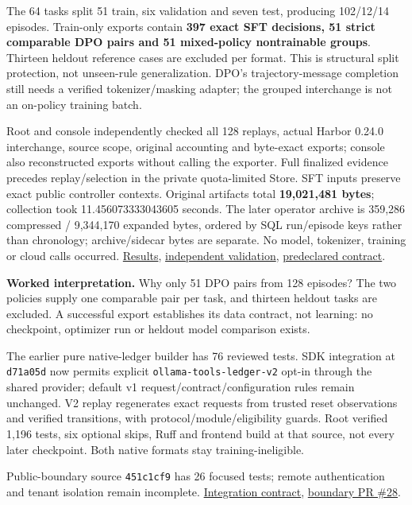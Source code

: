 \documentclass[
  11pt,
  letterpaper,
]{article}
\begin{document}
The 64 tasks split 51 train, six validation and seven test, producing
102/12/14 episodes. Train-only exports contain \textbf{397 exact SFT
decisions, 51 strict comparable DPO pairs and 51 mixed-policy
nontrainable groups}. Thirteen heldout reference cases are excluded per
format. This is structural split protection, not unseen-rule
generalization. DPO's trajectory-message completion still needs a
verified tokenizer/masking adapter; the grouped interchange is not an
on-policy training batch.

Root and console independently checked all 128 replays, actual Harbor
0.24.0 interchange, source scope, original accounting and byte-exact
exports; console also reconstructed exports without calling the
exporter. Full finalized evidence precedes replay/selection in the
private quota-limited Store. SFT inputs preserve exact public controller
contexts. Original artifacts total \textbf{19,021,481 bytes}; collection
took 11.456073333043605 seconds. The later operator archive is 359,286
compressed / 9,344,170 expanded bytes, ordered by SQL run/episode keys
rather than chronology; archive/sidecar bytes are separate. No model,
tokenizer, training or cloud calls occurred.
\href{../scripted-candidate-results.md}{Results},
\href{../../artifacts/candidate-corpus/20261010-v1/independent-validation.json}{independent
validation}, \href{../scripted-candidate-corpus.md}{predeclared
contract}.

\textbf{Worked interpretation.} Why only 51 DPO pairs from 128 episodes?
The two policies supply one comparable pair per task, and thirteen
heldout tasks are excluded. A successful export establishes its data
contract, not learning: no checkpoint, optimizer run or heldout model
comparison exists.

The earlier pure native-ledger builder has 76 reviewed tests. SDK
integration at \texttt{d71a05d} now permits explicit
\texttt{ollama-tools-ledger-v2} opt-in through the shared provider;
default v1 request/contract/configuration rules remain unchanged. V2
replay regenerates exact requests from trusted reset observations and
verified transitions, with protocol/module/eligibility guards. Root
verified 1,196 tests, six optional skips, Ruff and frontend build at
that source, not every later checkpoint. Both native formats stay
training-ineligible.

Public-boundary source \texttt{451c1cf9} has 26 focused tests; remote
authentication and tenant isolation remain incomplete.
\href{../native-ledger.md}{Integration contract},
\href{https://github.com/nthpaul/world-engine/pull/28}{boundary PR
\#28}.
\end{document}
